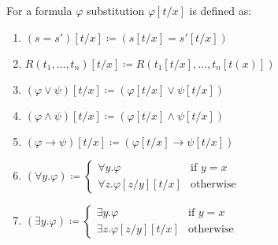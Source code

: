 \begin{boxdef}
\begin{defi}
    For a formula $\varphi$ \alert{substitution $\varphi[t/x]$} is defined as: 
    \begin{enumerate}
        \item $(s = s')[t/x] \coloneq (s[t/x] = s'[t/x])$
        \item $R(t_1, \dots, t_n)[t/x] \coloneq R(t_1[t/x], \dots, t_n[t(x)])$
        \item $(\varphi \lor \psi)[t/x] \coloneq (\varphi[t/x] \lor \psi[t/x])$
        \item $(\varphi \wedge \psi)[t/x] \coloneq (\varphi[t/x] \wedge \psi[t/x])$
        \item $(\varphi \to \psi)[t/x] \coloneq (\varphi[t/x] \to \psi[t/x])$
        \item {$ (\forall y. \varphi) \coloneq 
            \begin{cases}
                \forall y. \varphi & \text{if } y = x \\
                \forall z. \varphi[z/y][t/x] & \text{otherwise}
            \end{cases}$}
        \item {$ (\exists y. \varphi) \coloneq 
        \begin{cases}
            \exists y. \varphi & \text{if } y = x \\
            \exists z. \varphi[z/y][t/x] & \text{otherwise}
        \end{cases}$}
    \end{enumerate}
\end{defi}
\end{boxdef}

